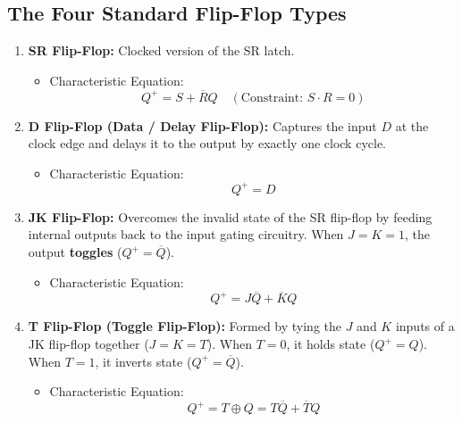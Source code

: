 \subsection{The Four Standard Flip-Flop Types}
\begin{enumerate}[label=\bfseries\arabic*.]
    \item \textbf{SR Flip-Flop:} Clocked version of the SR latch.
    \begin{itemize}
        \item Characteristic Equation:
        \begin{equation}
        \label{eq:sr_char}
        Q^+ = S + \overline{R} Q \quad (\text{Constraint: } S \cdot R = 0)
        \end{equation}
    \end{itemize}
    \item \textbf{D Flip-Flop (Data / Delay Flip-Flop):} Captures the input $D$ at the clock edge and delays it to the output by exactly one clock cycle.
    \begin{itemize}
        \item Characteristic Equation:
        \begin{equation}
        \label{eq:d_char}
        Q^+ = D
        \end{equation}
    \end{itemize}
    \item \textbf{JK Flip-Flop:} Overcomes the invalid state of the SR flip-flop by feeding internal outputs back to the input gating circuitry. When $J=K=1$, the output \textbf{toggles} ($Q^+ = \overline{Q}$).
    \begin{itemize}
        \item Characteristic Equation:
        \begin{equation}
        \label{eq:jk_char}
        Q^+ = J \overline{Q} + \overline{K} Q
        \end{equation}
    \end{itemize}
    \item \textbf{T Flip-Flop (Toggle Flip-Flop):} Formed by tying the $J$ and $K$ inputs of a JK flip-flop together ($J = K = T$). When $T=0$, it holds state ($Q^+ = Q$). When $T=1$, it inverts state ($Q^+ = \overline{Q}$).
    \begin{itemize}
        \item Characteristic Equation:
        \begin{equation}
        \label{eq:t_char}
        Q^+ = T \oplus Q = T \overline{Q} + \overline{T} Q
        \end{equation}
    \end{itemize}
\end{enumerate}

